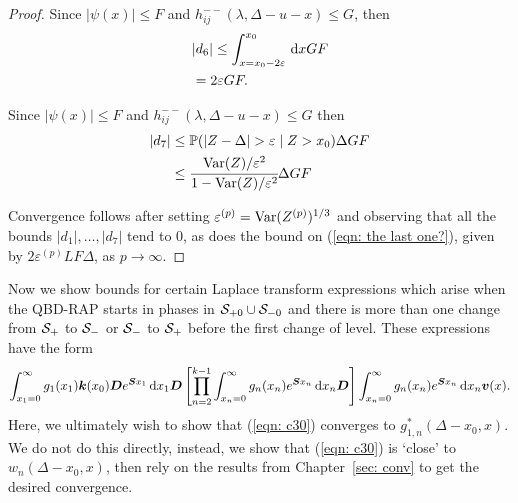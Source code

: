 \begin{proof}
	Since \(|\psi(x)|\leq F\) and \(h_{ij}^{--}(\lambda,\Delta-u-x)\leq G\), then
	\begin{align}
		&|d_6| \leq \int_{x=x_0-2\varepsilon}^{x_0} \, \mathrm{d} x GF\nonumber 
		\\&= 2\varepsilon GF.
	\end{align}
	
	Since \(|\psi(x)|\leq F\) and \(h_{ij}^{--}(\lambda,\Delta-u-x)\leq G\) then
	\begin{align}
		|d_7|&\leq \mathbb P(|Z-\Delta|> \varepsilon\mid Z>x_0)\Delta GF
		\\&\leq \cfrac{\var(Z)/\varepsilon^2}{1-\var(Z)/\varepsilon^2}\Delta GF
	\end{align}
	
	Convergence follows after setting \(\varepsilon^{(p)}=\mathrm{Var}(Z^{(p)})^{1/3}\) and observing that all the bounds \(|d_1|,\dots,|d_7|\) tend to 0, as does the bound on (\ref{eqn: the last one?}), given by \(2\varepsilon^{(p)}LF\Delta\), as \(p\to\infty\). 
\end{proof}  

	Now we show bounds for certain Laplace transform expressions which arise when the QBD-RAP starts in phases in \(\mathcal{S}_{+0}\cup\mathcal{S}_{-0}\) and there is more than one change from \(\mathcal{S}_+\) to \(\mathcal{S}_-\) or \(\mathcal{S}_-\) to \(\mathcal{S}_+\) before the first change of level. These expressions have the form
	\begin{align}
		\int_{x_1=0}^\infty g_1(x_1) \boldsymbol k(x_0) \boldsymbol D e^{\boldsymbol{S}x_1}\, \mathrm{d} x_1\boldsymbol D 
            	\left[\prod_{n=2}^{k-1}\int_{x_n=0}^\infty g_n(x_n) e^{\boldsymbol{S}x_n} \, \mathrm{d} x_n
		\boldsymbol D\right]
            	\int_{x_n=0}^\infty g_{n}(x_n) e^{\boldsymbol{S}x_n} \, \mathrm{d} x_n {\boldsymbol v}(x). \label{eqn: c30}
	\end{align}
	Here, we ultimately wish to show that (\ref{eqn: c30}) converges to \(g_{1,n}^*(\Delta-x_0,x)\). We do not do this directly, instead, we show that (\ref{eqn: c30}) is `close' to \(w_n(\Delta-x_0,x)\), then rely on the results from Chapter~\ref{sec: conv} to get the desired convergence. 
	
